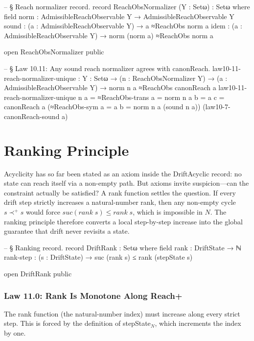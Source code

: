 \documentclass[11pt,a4paper]{book}
\def\mathbb#1{#1}%
\def\texttt#1{#1}%
\def\texorpdfstring#1#2{#2}%
\begin{document}
\begin{code}
-- § Reach normalizer record.
record ReachObsNormalizer (Y : Setω) : Setω where
  field
    norm  : AdmissibleReachObservable Y → AdmissibleReachObservable Y
    sound : (a : AdmissibleReachObservable Y) → a ≈ReachObs norm a
    idem  : (a : AdmissibleReachObservable Y) → norm (norm a) ≈ReachObs norm a

open ReachObsNormalizer public

-- § Law 10.11: Any sound reach normalizer agrees with canonReach.
law10-11-reach-normalizer-unique :
  {Y : Setω} →
  (n : ReachObsNormalizer Y) →
  (a : AdmissibleReachObservable Y) →
  norm n a ≈ReachObs canonReach a
law10-11-reach-normalizer-unique n a =
  ≈ReachObs-trans
    {a = norm n a}
    {b = a}
    {c = canonReach a}
    (≈ReachObs-sym {a = a} {b = norm n a} (sound n a))
    (law10-7-canonReach-sound a)
\end{code}

\chapter{Ranking Principle}

Acyclicity has so far been stated as an axiom inside the \texttt{DriftAcyclic} record: no state can reach itself via a non-empty path. But axioms invite suspicion---can the constraint actually be satisfied? A rank function settles the question. If every drift step strictly increases a natural-number rank, then any non-empty cycle $s \prec^+ s$ would force $\texttt{suc (rank}\;s\texttt{)} \le \texttt{rank}\;s$, which is impossible in $\mathbb{N}$. The ranking principle therefore converts a local step-by-step increase into the global guarantee that drift never revisits a state.

\begin{code}
-- § Ranking record.
record DriftRank : Setω where
  field
    rank      : DriftState → ℕ
    rank-step : (s : DriftState) → suc (rank s) ≤ rank (stepState s)

open DriftRank public
\end{code}

\subsection{Law 11.0: Rank Is Monotone Along Reach\texorpdfstring{$^+$}{+}}

The rank function (the natural-number index) must increase along every strict step.
This is forced by the definition of \texttt{stepState$_{\mathbb{N}}$}, which increments the index by one.
\end{document}
